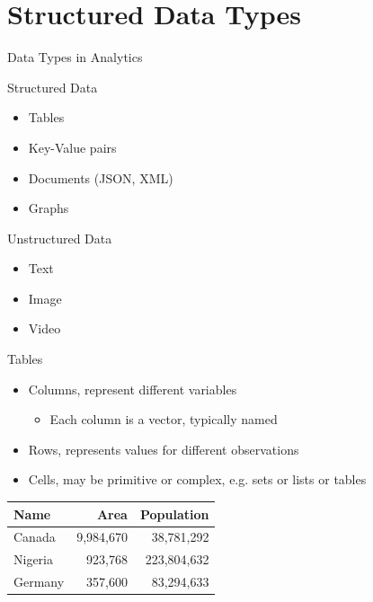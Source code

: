 \documentclass[ignorenonframetext,xcolor=x11names]{beamer}
\begin{document}
\section{Structured Data Types}

\begin{frame}[label=full]{Data Types in Analytics}
\begin{block}{Structured Data}
\begin{itemize}
	\item Tables
	\item Key-Value pairs
	\item Documents (JSON, XML)
	\item Graphs
\end{itemize}
\end{block}
\begin{block}{Unstructured Data}
\begin{itemize}
	\item Text
	\item Image
	\item Video
\end{itemize}
\end{block}
\end{frame}

\begin{frame}[label=full]{Tables}
\begin{itemize}
	\item Columns, represent different variables
		\begin{itemize}
			\item Each column is a vector, typically named
		\end{itemize}
	\item Rows, represents values for different observations
	\item Cells, may be primitive or complex, e.g. sets or lists or tables
\end{itemize}
\centering
\vspace{5mm}
\renewcommand{\arraystretch}{1.25}

\begin{tabular}{l|r|r} \hline
\textbf{Name} & \textbf{Area} & \textbf{Population} \\ \hline
Canada & 9,984,670 & 38,781,292  \\
Nigeria & 923,768 & 223,804,632 \\
Germany & 357,600 & 83,294,633 \\ \hline
\end{tabular}
\end{frame}
\end{document}
